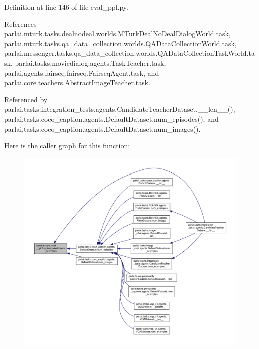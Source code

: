 Definition at line 146 of file eval\+\_\+ppl.\+py.



References parlai.\+mturk.\+tasks.\+dealnodeal.\+worlds.\+M\+Turk\+Deal\+No\+Deal\+Dialog\+World.\+task, parlai.\+mturk.\+tasks.\+qa\+\_\+data\+\_\+collection.\+worlds.\+Q\+A\+Data\+Collection\+World.\+task, parlai.\+messenger.\+tasks.\+qa\+\_\+data\+\_\+collection.\+worlds.\+Q\+A\+Data\+Collection\+Task\+World.\+task, parlai.\+tasks.\+moviedialog.\+agents.\+Task\+Teacher.\+task, parlai.\+agents.\+fairseq.\+fairseq.\+Fairseq\+Agent.\+task, and parlai.\+core.\+teachers.\+Abstract\+Image\+Teacher.\+task.



Referenced by parlai.\+tasks.\+integration\+\_\+tests.\+agents.\+Candidate\+Teacher\+Dataset.\+\_\+\+\_\+len\+\_\+\+\_\+(), parlai.\+tasks.\+coco\+\_\+caption.\+agents.\+Default\+Dataset.\+num\+\_\+episodes(), and parlai.\+tasks.\+coco\+\_\+caption.\+agents.\+Default\+Dataset.\+num\+\_\+images().

Here is the caller graph for this function\+:
\nopagebreak
\begin{figure}[H]
\begin{center}
\leavevmode
\includegraphics[width=350pt]{classparlai_1_1scripts_1_1eval__ppl_1_1PerplexityWorld_a13673a4d9cb9a57fbc219336bea1f510_icgraph}
\end{center}
\end{figure}
\mbox{\label{classparlai_1_1scripts_1_1eval__ppl_1_1PerplexityWorld_a9040f1a4e0d541a36970ca7c73f5591b}} 
